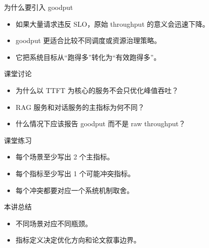 \begin{frame}{为什么要引入 goodput}
  \begin{itemize}
    \item 如果大量请求违反 SLO，原始 throughput 的意义会迅速下降。
    \item goodput 更适合比较不同调度或资源治理策略。
    \item 它把系统目标从“跑得多”转化为“有效跑得多”。
  \end{itemize}
\end{frame}



\begin{frame}{课堂讨论}
  \begin{itemize}
    \item 为什么以 TTFT 为核心的服务不会只优化峰值吞吐？
    \item RAG 服务和对话服务的主指标为何不同？
    \item 什么情况下应该报告 goodput 而不是 raw throughput？
  \end{itemize}
\end{frame}

\begin{frame}{课堂练习}
  \begin{itemize}
    \item 每个场景至少写出 2 个主指标。
    \item 每个指标至少写出 1 个可能冲突指标。
    \item 每个冲突都要对应一个系统机制取舍。
  \end{itemize}
\end{frame}

\begin{frame}{本讲总结}
  \begin{itemize}
    \item 不同场景对应不同瓶颈。
    \item 指标定义决定优化方向和论文叙事边界。
  \end{itemize}
\end{frame}

